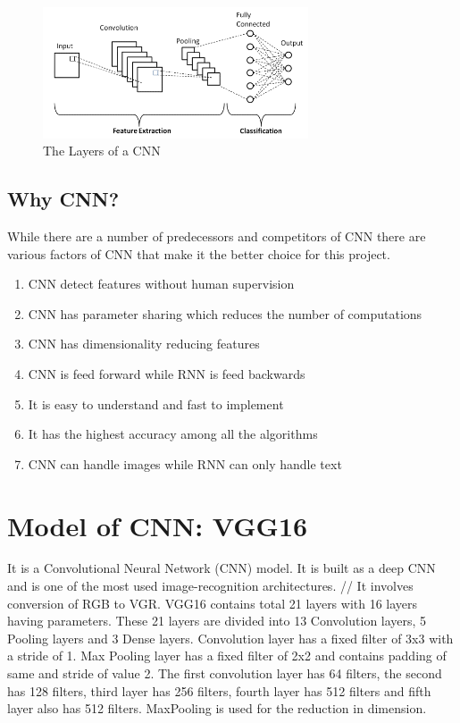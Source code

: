 \begin{figure} [h!]
\centering
\includegraphics[width=0.7\textwidth]{CNN.png}
\caption{\label{fig:frog}The Layers of a CNN}
\end{figure}

\subsection{Why CNN?}
While there are a number of predecessors and competitors of CNN there are various factors of CNN that make it the better choice for this project.
\begin{enumerate}
\item CNN detect features without human supervision
\item CNN has parameter sharing which reduces the number of computations
\item CNN has dimensionality reducing features
\item CNN is feed forward while RNN is feed backwards
\item It is easy to understand and fast to implement
\item It has the highest accuracy among all the algorithms
\item CNN can handle images while RNN can only handle text
\end{enumerate}

\section{Model of CNN: VGG16}
It is a Convolutional Neural Network (CNN) model. It is built as a deep CNN and is one of the most used image-recognition architectures. //
It involves conversion of RGB to VGR. VGG16 contains total 21 layers with 16 layers having parameters. These 21 layers are divided into 13 Convolution layers, 5 Pooling layers and 3 Dense layers. Convolution layer has a fixed filter of 3x3 with a stride of 1. Max Pooling layer has a fixed filter of 2x2 and contains padding of same and stride of value 2. The first convolution layer has 64 filters, the second has 128 filters, third layer has 256 filters, fourth layer has 512 filters and fifth layer also has 512 filters. MaxPooling is used for the reduction in dimension. 

